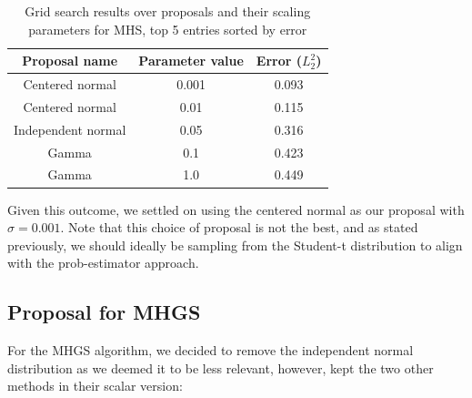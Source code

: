 \documentclass[12pt]{memoir}
\begin{document}
\begin{table}[H]

    \begin{center}

        \begin{tabular}{|c|c|c|}

            \hline

            Proposal name & Parameter value & Error ($L_2^2$)\\

            \hline\hline

            Centered normal& 0.001 & 0.093\\

            Centered normal&0.01  &0.115\\

            Independent normal& 0.05 &0.316\\

            Gamma&0.1  &0.423\\

            Gamma&1.0   &0.449\\\hline

        \end{tabular}

\end{center}

\caption{Grid search results over proposals and their scaling parameters for MHS, top 5 entries sorted by error}

\label{table:proposal-grid-search-mhs}

\end{table}

Given this outcome, we settled on using the centered normal as our proposal with $\sigma=0.001$. Note that this choice of proposal is not the best, and as stated previously, we should ideally be sampling from the Student-t distribution to align with the prob-estimator approach.


\subsection*{Proposal for MHGS}

For the MHGS algorithm, we decided to remove the independent normal distribution as we deemed it to be less relevant, however, kept the two other methods in their scalar version:
\end{document}
